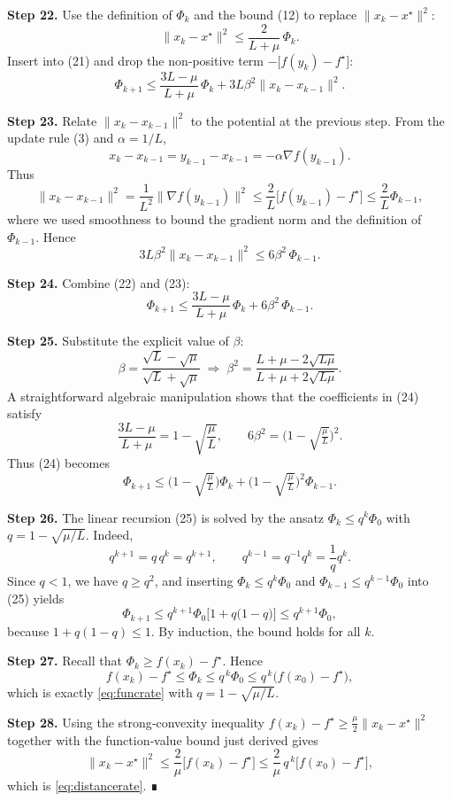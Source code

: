 \documentclass{article}
\newcommand{\grad}{\nabla}
\begin{document}
\noindent\textbf{Step 22.}  Use the definition of $\Phi_k$ and the bound (12) to replace $\|x_k-x^\star\|^2$:
\[
\|x_k-x^\star\|^2 \le \frac{2}{L+\mu}\,\Phi_k .
\]
Insert into (21) and drop the non‑positive term $-\bigl[f(y_k)-f^\star\bigr]$:
\[
\Phi_{k+1}\le \frac{3L-\mu}{L+\mu}\,\Phi_k +3L\beta^2\|x_k-x_{k-1}\|^2 . \tag{22}
\]

\noindent\textbf{Step 23.}  Relate $\|x_k-x_{k-1}\|^2$ to the potential at the previous step. From the update rule (3) and $\alpha=1/L$,
\[
x_k-x_{k-1}= y_{k-1}-x_{k-1}= -\alpha\grad f(y_{k-1}) .
\]
Thus
\[
\|x_k-x_{k-1}\|^2 = \frac{1}{L^2}\|\grad f(y_{k-1})\|^2
\le \frac{2}{L}\bigl[f(y_{k-1})-f^\star\bigr] \le \frac{2}{L}\Phi_{k-1},
\]
where we used smoothness to bound the gradient norm and the definition of $\Phi_{k-1}$. Hence
\[
3L\beta^2\|x_k-x_{k-1}\|^2 \le 6\beta^2\,\Phi_{k-1}. \tag{23}
\]

\noindent\textbf{Step 24.}  Combine (22) and (23):
\[
\Phi_{k+1}\le \frac{3L-\mu}{L+\mu}\,\Phi_k + 6\beta^2\,\Phi_{k-1}. \tag{24}
\]

\noindent\textbf{Step 25.}  Substitute the explicit value of $\beta$:
\[
\beta = \frac{\sqrt{L}-\sqrt{\mu}}{\sqrt{L}+\sqrt{\mu}}
\;\Longrightarrow\;
\beta^2 = \frac{L+\mu-2\sqrt{L\mu}}{L+\mu+2\sqrt{L\mu}} .
\]
A straightforward algebraic manipulation shows that the coefficients in (24) satisfy
\[
\frac{3L-\mu}{L+\mu}=1-\sqrt{\frac{\mu}{L}},\qquad
6\beta^2 =\bigl(1-\sqrt{\tfrac{\mu}{L}}\bigr)^2 .
\]
Thus (24) becomes
\[
\Phi_{k+1}\le \bigl(1-\sqrt{\tfrac{\mu}{L}}\bigr)\Phi_k
+\bigl(1-\sqrt{\tfrac{\mu}{L}}\bigr)^2\Phi_{k-1}. \tag{25}
\]

\noindent\textbf{Step 26.}  The linear recursion (25) is solved by the ansatz $\Phi_k\le q^k\Phi_0$ with $q=1-\sqrt{\mu/L}$. Indeed,
\[
q^{k+1}=q\,q^{k}=q^{k+1},\qquad
q^{k-1}=q^{-1}q^{k}= \frac{1}{q} q^{k}.
\]
Since $q<1$, we have $q\ge q^2$, and inserting $\Phi_k\le q^k\Phi_0$ and $\Phi_{k-1}\le q^{k-1}\Phi_0$ into (25) yields
\[
\Phi_{k+1}\le q^{k+1}\Phi_0\bigl[1+q\bigl(1-q\bigr)\bigr]\le q^{k+1}\Phi_0,
\]
because $1+q(1-q)\le 1$. By induction, the bound holds for all $k$.

\noindent\textbf{Step 27.}  Recall that $\Phi_k\ge f(x_k)-f^\star$. Hence
\[
f(x_k)-f^\star \le \Phi_k \le q^{\,k}\Phi_0 \le q^{\,k}\bigl(f(x_0)-f^\star\bigr),
\]
which is exactly \eqref{eq:funcrate} with $q=1-\sqrt{\mu/L}$.

\noindent\textbf{Step 28.}  Using the strong‑convexity inequality $f(x_k)-f^\star\ge \frac{\mu}{2}\|x_k-x^\star\|^2$ together with the function‑value bound just derived gives
\[
\|x_k-x^\star\|^2 \le \frac{2}{\mu}\bigl[f(x_k)-f^\star\bigr]
\le \frac{2}{\mu}\,q^{\,k}\bigl[f(x_0)-f^\star\bigr],
\]
which is \eqref{eq:distancerate}. ∎
\end{document}
